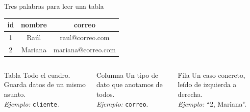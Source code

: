 \documentclass[aspectratio=169,10pt,c]{beamer}
\begin{document}
\begin{frame}{Tres palabras para leer una tabla}
\begin{center}
\small
\begin{tabular}{ccc}
\toprule
\bfseries id & \bfseries nombre & \bfseries correo \\
\midrule
1 & Raúl & raul@correo.com \\
2 & Mariana & mariana@correo.com \\
\bottomrule
\end{tabular}
\end{center}
\vspace{0.4cm}
\begin{columns}[T,onlytextwidth]
\begin{block}{Tabla}
\small Todo el cuadro. Guarda datos de un mismo asunto.\\[3pt]
\textit{Ejemplo:} \texttt{cliente}.
\end{block}
\begin{block}{Columna}
\small Un tipo de dato que anotamos de todos.\\[3pt]
\textit{Ejemplo:} \texttt{correo}.
\end{block}
\begin{block}{Fila}
\small Un caso concreto, leído de izquierda a derecha.\\[3pt]
\textit{Ejemplo:} ``2, Mariana''.
\end{block}
\end{columns}
\end{frame}
\end{document}
